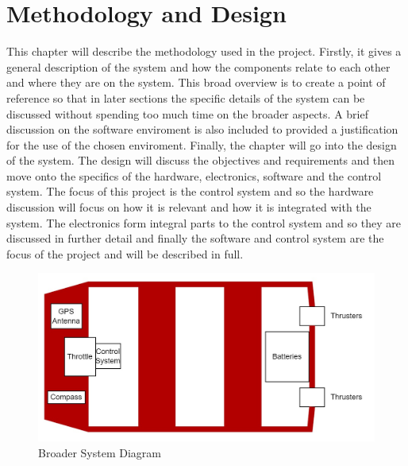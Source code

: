 \chapter{Methodology and Design}
This chapter will describe the methodology used in the project. Firstly, it gives a general description of the system and how the components relate to each other and where they are on the system. This broad overview is to create a point of reference so that in later sections the specific details of the system can be discussed without spending too much time on the broader aspects. A brief discussion on the software enviroment is also included to provided a justification for the use of the chosen enviroment. Finally, the chapter will go into the design of the system. The design will discuss the objectives and requirements and then move onto the specifics of the hardware, electronics, software and the control system. The focus of this project is the control system and so the hardware discussion will focus on how it is relevant and how it is integrated with the system. The electronics form integral parts to the control system and so they are discussed in further detail and finally the software and control system are the focus of the project and will be described in full.\par
\begin{figure}[hb]
	\begin{center}
		\includegraphics[width = 0.7\linewidth]{figures/BoatLayout.jpg}
		\caption{Broader System Diagram}
		\label{fig:3:boatDiag}
	\end{center}
\end{figure}
